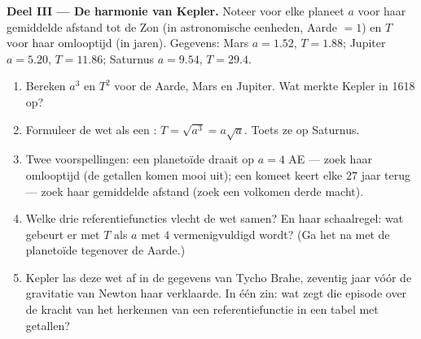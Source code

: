 \begin{problem}
\medskip
\noindent\textbf{Deel III --- De harmonie van Kepler.}
Noteer voor elke planeet $a$ voor haar gemiddelde afstand tot de Zon (in
astronomische eenheden, Aarde $= 1$) en $T$ voor haar omlooptijd (in jaren).
Gegevens: Mars $a = 1.52$, $T = 1.88$; Jupiter $a = 5.20$, $T = 11.86$;
Saturnus $a = 9.54$, $T = 29.4$.
\begin{enumerate}[resume]
  \item Bereken $a^3$ en $T^2$ voor de Aarde, Mars en Jupiter. Wat merkte
        Kepler in 1618 op?
  \item Formuleer de wet als een : $T = \sqrt{a^3} = a\sqrt a$. Toets
        ze op Saturnus.
  \item Twee voorspellingen: een planetoïde draait op $a = 4$ AE --- zoek
        haar omlooptijd (de getallen komen mooi uit); een komeet keert elke
        $27$ jaar terug --- zoek haar gemiddelde afstand (zoek een volkomen
        derde macht).
  \item Welke drie referentiefuncties vlecht de wet samen? En haar
        schaalregel: wat gebeurt er met $T$ als $a$ met $4$ vermenigvuldigd
        wordt? (Ga het na met de planetoïde tegenover de Aarde.)
  \item Kepler las deze wet af in de gegevens van Tycho Brahe, zeventig jaar
        vóór de gravitatie van Newton haar verklaarde. In één zin: wat zegt
        die episode over de kracht van het herkennen van een referentiefunctie
        in een tabel met getallen?
\end{enumerate}


\end{problem}
